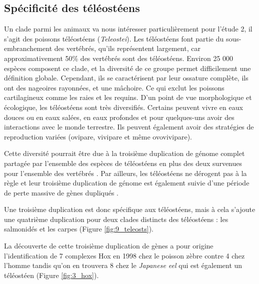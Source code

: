 \subsection{Spécificité des téléostéens}\label{teleost}
\par Un clade parmi les animaux va nous intéresser particulièrement pour l’étude 2, il s’agit des poissons téléostéens (\textit{Teleostei}). Les téléostéens font partie du sous-embranchement des vertébrés, qu'ils représentent largement, car approximativement 50\% des vertébrés sont des téléostéens. Environ 25 000 espèces composent ce clade, et la diversité de ce groupe permet difficilement une définition globale. Cependant, ils se caractérisent par leur ossature complète, ils ont des nageoires rayonnées, et une mâchoire. Ce qui exclut les poissons cartilagineux comme les raies et les requins. D’un point de vue morphologique et écologique, les téléostéens sont très diversifiés. Certains peuvent vivre en eaux douces ou en eaux salées, en eaux profondes et pour quelques-uns avoir des interactions avec le monde terrestre. Ils peuvent également avoir des stratégies de reproduction variées (ovipare, vivipare et même ovovivipare). 
\par Cette diversité pourrait être due à la troisième duplication de génome complet partagée par l’ensemble des espèces de téléostéens en plus des deux survenues pour l’ensemble des vertébrés \parencite{ravi_rapidly_2008, taylor_genome_2003}. Par ailleurs, les téléostéens ne dérogent pas à la règle et leur troisième duplication de génome est également suivie d’une période de perte massive de gènes dupliqués \parencite{inoue_rapid_2015}. 
\par Une troisième duplication est donc spécifique aux téléostéens, mais à cela s’ajoute une quatrième duplication pour deux clades distincts des téléostéens : les salmonidés et les carpes \parencite{jaillon_genome_2004, lien_atlantic_2016}  (Figure \ref{fig:9_teleosts}).
\par La découverte de cette troisième duplication de gènes a pour origine l’identification de 7 complexes Hox en 1998 chez le poisson zèbre contre 4 chez l’homme \parencite{amores_zebrafish_1998} tandis qu’on en trouvera 8 chez le \textit{Japanese eel} qui est également un téléostéen \parencite{guo_hox_2010} (Figure \ref{fig:3_hox}). \newpage

